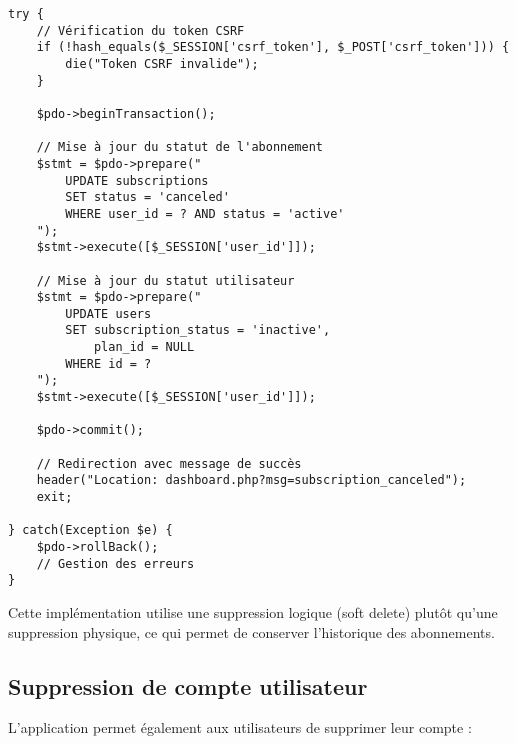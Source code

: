 \documentclass[12pt,a4paper]{report}
\begin{document}
\begin{lstlisting}[style=phpStyle, caption=Extrait de cancel\_subscription.php - Annulation d'abonnement]
try {
    // Vérification du token CSRF
    if (!hash_equals($_SESSION['csrf_token'], $_POST['csrf_token'])) {
        die("Token CSRF invalide");
    }
    
    $pdo->beginTransaction();
    
    // Mise à jour du statut de l'abonnement
    $stmt = $pdo->prepare("
        UPDATE subscriptions 
        SET status = 'canceled'
        WHERE user_id = ? AND status = 'active'
    ");
    $stmt->execute([$_SESSION['user_id']]);
    
    // Mise à jour du statut utilisateur
    $stmt = $pdo->prepare("
        UPDATE users 
        SET subscription_status = 'inactive',
            plan_id = NULL
        WHERE id = ?
    ");
    $stmt->execute([$_SESSION['user_id']]);
    
    $pdo->commit();
    
    // Redirection avec message de succès
    header("Location: dashboard.php?msg=subscription_canceled");
    exit;
    
} catch(Exception $e) {
    $pdo->rollBack();
    // Gestion des erreurs
}
\end{lstlisting}

Cette implémentation utilise une suppression logique (soft delete) plutôt qu'une suppression physique, ce qui permet de conserver l'historique des abonnements.

\subsection{Suppression de compte utilisateur}
L'application permet également aux utilisateurs de supprimer leur compte :
\end{document}
